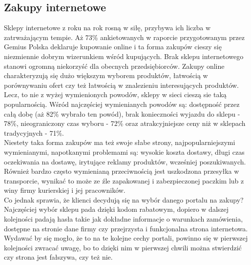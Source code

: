 \documentclass[12pt]{article}
\begin{document}
\begin{sloppypar}
{  \subsection{Zakupy internetowe}
  {
    Sklepy internetowe z roku na rok rosną w siłę, przybywa ich liczba w zatrważającym tempie. 
    Aż 73\% ankietowanych w raporcie przygotowanym przez Gemius Polska\cite{gemius-report} deklaruje kupowanie online i ta forma zakupów cieszy się niezmiennie dobrym 
    wizerunkiem wśród kupujących. Brak sklepu internetowego stanowi ogromną niekorzyść dla obecnych przedsiębiorców. 
    Zakupy online charakteryzują się dużo większym wyborem produktów, łatwością w porównywaniu ofert czy też łatwością w znalezieniu interesujących produktów. 
    Lecz, to nie z wyżej wymienionych powodów, sklepy w sieci cieszą sie taką popularnością.
    Wśród najczęściej wymienianych powodów są: dostępność przez całą dobę (aż 82\% wybrało ten powód), brak konieczności wyjazdu do sklepu - 78\%, 
    nieograniczony czas wyboru - 72\% oraz atrakcyjniejsze ceny niż w sklepach tradycyjnych - 71\%.\\
    Niestety taka forma zakupów ma też swoje słabe strony, najpopularniejszymi
    wymienianymi, napotkanymi problemami są: wysokie koszta dostawy, długi czas oczekiwania na dostawę, irytujące reklamy produktów, wcześniej poszukiwanych.
    Również bardzo często wymienianą przeciwnością jest uszkodzona przesyłka w transporcie, wynikać to może ze źle zapakowanej i zabezpieczonej paczkim lub z winy 
    firmy kurierskiej i jej pracowników.\\
    Co jednak sprawia, że klienci decydują się na wybór danego portalu na zakupy?\\
    Najczęściej wybór sklepu pada dzięki kodom rabatowym, dopiero w dalszej kolejności padają hasła takie jak dokładne informacje o warunkach zamówienia,
    dostępne na stronie dane firmy czy przejrzysta i funkcjonalna strona internetowa. Wydawać by się mogło, że to na te kolejne cechy portali, powinno się w pierwszej kolejności
    zwracać uwagę, bo to dzięki nim w pierwszej chwili można stwierdzić czy strona jest fałszywa, czy też nie.
    }
}
\end{sloppypar}
\end{document}
